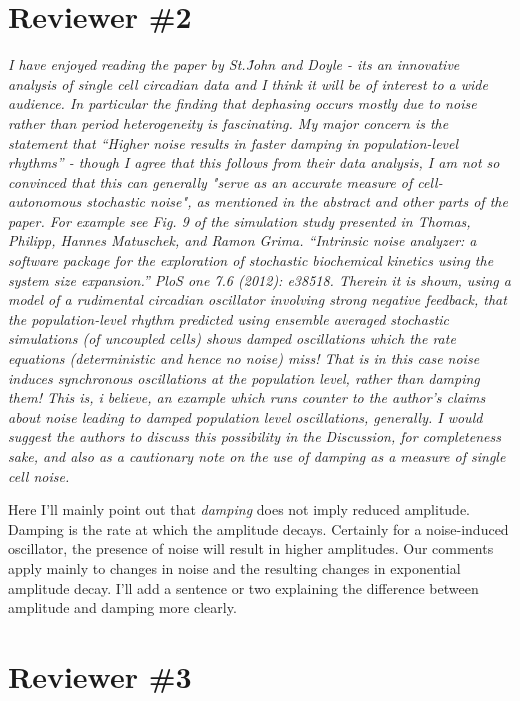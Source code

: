 \documentclass[11pt, letterpaper]{article}
\newenvironment{reviewer}{\itshape\color{gray}}{}
\begin{document}
\section*{Reviewer \#2}
\begin{reviewer}
I have enjoyed reading the paper by St.\~John and Doyle - its an innovative analysis of single cell circadian data and I think it will be of interest to a wide audience. 
In particular the finding that dephasing occurs mostly due to noise rather than period heterogeneity is fascinating. 
My major concern is the statement that ``Higher noise results in faster damping in population-level rhythms'' - though I agree that this follows from their data analysis, I am not so convinced that this can generally "serve as an accurate measure of cell-autonomous stochastic noise", as mentioned in the abstract and other parts of the paper. 
For example see Fig. 9 of the simulation study presented in Thomas, Philipp, Hannes Matuschek, and Ramon Grima. 
``Intrinsic noise analyzer: a software package for the exploration of stochastic biochemical kinetics using the system size expansion.'' PloS one 7.6 (2012): e38518.
Therein it is shown, using a model of a rudimental circadian oscillator involving strong negative feedback, that the population-level rhythm predicted using ensemble averaged stochastic simulations (of uncoupled cells) shows damped oscillations which the rate equations (deterministic and hence no noise) miss!
That is in this case noise induces synchronous oscillations at the population level, rather than damping them! This is, i believe, an example which runs counter to the author's claims about noise leading to damped population level oscillations, generally. 
I would suggest the authors to discuss this possibility in the Discussion, for completeness sake, and also as a cautionary note on the use of damping as a measure of single cell noise.
\end{reviewer}

Here I'll mainly point out that {\itshape damping} does not imply reduced amplitude. Damping is the rate at which the amplitude decays.
Certainly for a noise-induced oscillator, the presence of noise will result in higher amplitudes. Our comments apply mainly to changes in noise and the resulting changes in exponential amplitude decay.
I'll add a sentence or two explaining the difference between amplitude and damping more clearly.

\section*{Reviewer \#3}
\end{document}
